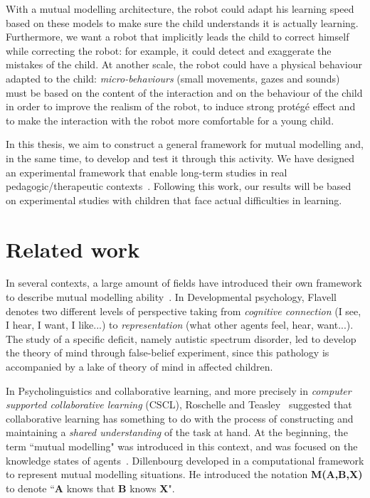 \documentclass[10pt,a4paper,twocolumn]{article}
\begin{document}
With a mutual modelling architecture, the robot could adapt his learning speed based on these models to make sure the child understands it is actually learning. Furthermore, we want a robot that implicitly leads the child to correct himself while correcting the robot: for example, it could detect and exaggerate the mistakes of the child. At another scale, the robot could have a physical behaviour adapted to the child: \textit{micro-behaviours} (small movements, gazes and sounds) must be based on the content of the interaction and on the behaviour of the child in order to improve the realism of the robot, to induce strong prot\'eg\'e effect and to make the interaction with the robot more comfortable for a young child. 

In this thesis, we aim to construct a general framework for mutual modelling and, in the same time, to develop and test it through this activity. We have designed an experimental framework that enable long-term studies in real pedagogic/therapeutic contexts~\cite{jacq2016building}. Following this work, our results will be based on experimental studies with children that face actual difficulties in learning. 

\section{Related work}


In several contexts, a large amount of fields have introduced their own framework to describe mutual modelling ability~\cite{lemaignan2015mutual}. 
In Developmental psychology, Flavell~\cite{flavell1990developmental} denotes two different levels of perspective taking from \textit{cognitive connection} (I see, I hear, I want, I like...) to \textit{representation} (what other agents feel, hear, want...). The study of a specific deficit, namely autistic spectrum disorder, led to develop the theory of mind through false-belief experiment\cite{baron1985does}\cite{frith1994autism}, since this pathology is accompanied by a lake of theory of mind in affected children. 

In Psycholinguistics and collaborative learning, and more precisely in \textit{computer supported collaborative learning} (CSCL), Roschelle and Teasley~\cite{roschelle1995construction} suggested that collaborative learning has something to do with the process of constructing and maintaining a \textit{shared understanding} of the task at hand. 
At the beginning, the term ``mutual modelling" was introduced in this context, and was focused on the knowledge states of agents~\cite{dillenbourg1999you}. Dillenbourg developed in \cite{sangin2007partner} a computational framework to represent mutual modelling situations. He introduced the notation \textbf{M(A,B,X)} to denote ``\textbf{A} knows that \textbf{B} knows \textbf{X}".
\end{document}
